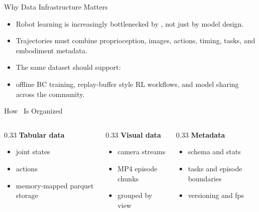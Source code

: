 \documentclass{beamer}
\begin{document}
\begin{frame}{Why Data Infrastructure Matters}
  \begin{itemize}
    \item Robot learning is increasingly bottlenecked by , not just by model design.
    \item Trajectories must combine proprioception, images, actions, timing, tasks, and embodiment metadata.
    \item The same dataset should support:
    \item offline BC training, replay-buffer style RL workflows, and model sharing across the community.
  \end{itemize}

  \vspace{0.25cm}
\end{frame}

\begin{frame}{How \lerobotdataset~Is Organized}
  \begin{columns}[T,onlytextwidth]
    \begin{column}{0.33\textwidth}
      \textbf{Tabular data}
      \begin{itemize}
        \item joint states
        \item actions
        \item memory-mapped parquet storage
      \end{itemize}
    \end{column}
    \begin{column}{0.33\textwidth}
      \textbf{Visual data}
      \begin{itemize}
        \item camera streams
        \item MP4 episode chunks
        \item grouped by view
      \end{itemize}
    \end{column}
    \begin{column}{0.33\textwidth}
      \textbf{Metadata}
      \begin{itemize}
        \item schema and stats
        \item tasks and episode boundaries
        \item versioning and fps
      \end{itemize}
    \end{column}
  \end{columns}

  \vspace{0.35cm}
\end{frame}
\end{document}

